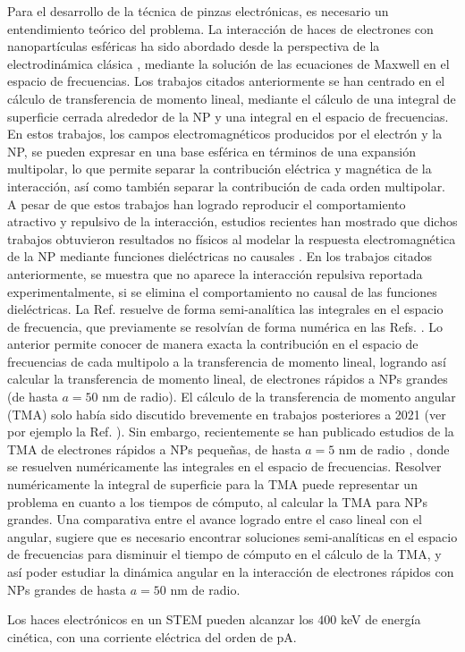 Para el desarrollo de la técnica de pinzas electrónicas, es necesario un entendimiento teórico del problema. La interacción de haces de electrones con nanopartículas esféricas ha sido abordado desde la perspectiva de la electrodinámica clásica \cite{GarciadeAbajo0, PRBCoronado, Lagos2, Batson2, xu2010transmission}, mediante la solución de las ecuaciones de Maxwell en el espacio de frecuencias. Los trabajos citados anteriormente se han centrado en el cálculo de transferencia de momento lineal, mediante el cálculo de una integral de superficie cerrada alrededor de la NP y una integral en el espacio de frecuencias. En estos trabajos, los campos electromagnéticos producidos por el electrón y la NP, se pueden expresar en una base esférica en términos de una expansión multipolar, lo que permite separar la contribución eléctrica y magnética de la interacción, así como también separar la contribución de cada orden multipolar. A pesar de que estos trabajos han logrado reproducir el comportamiento atractivo y repulsivo de la interacción, estudios recientes han mostrado que dichos trabajos obtuvieron resultados no físicos al modelar la respuesta electromagnética de la NP mediante funciones dieléctricas no causales \cite{castrejon2021effects, castrejon2021phdthesis}. En los trabajos citados anteriormente, se muestra que no aparece la interacción repulsiva reportada experimentalmente, si se elimina el comportamiento no causal de las funciones dieléctricas. La Ref. \cite{castrejon2021phdthesis} resuelve de forma semi-analítica las integrales en el espacio de frecuencia, que previamente se resolvían de forma numérica en las Refs. \cite{GarciadeAbajo0, PRBCoronado, Lagos2, Batson2, xu2010transmission}. Lo anterior permite conocer de manera exacta la contribución en el espacio de frecuencias de cada multipolo a la transferencia de momento lineal, logrando así calcular la transferencia de momento lineal, de electrones rápidos a NPs grandes (de hasta $a=50$ nm de radio). El cálculo de la transferencia de momento angular (TMA) solo había sido discutido brevemente en trabajos posteriores a 2021 (ver por ejemplo la Ref. \cite{GarciadeAbajo-1}). Sin embargo, recientemente se han publicado estudios de la TMA de electrones rápidos a NPs pequeñas, de hasta $a=5$ nm de radio \cite{castellanos2021phdthesis, castellanos2021angular,castellanos2023theory}, donde se resuelven numéricamente las integrales en el espacio de frecuencias. Resolver numéricamente la integral de superficie para la TMA puede representar un problema en cuanto a los tiempos de cómputo, al calcular la TMA para NPs grandes. Una comparativa entre el avance logrado entre el caso lineal con el angular, sugiere que es necesario encontrar soluciones semi-analíticas en el espacio de frecuencias para disminuir el tiempo de cómputo en el cálculo de la TMA, y así poder estudiar la dinámica angular en la interacción de electrones rápidos con NPs grandes de hasta $a=50$ nm de radio.

Los haces electrónicos en un STEM pueden alcanzar los $400$ keV de energía cinética, con una corriente eléctrica del orden de pA.